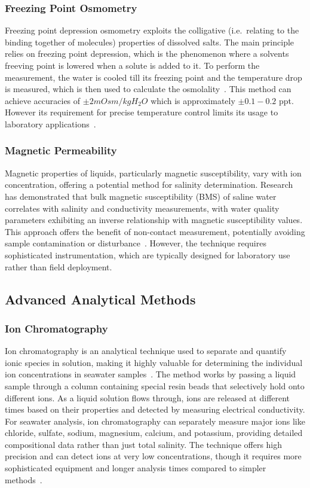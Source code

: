 \subsubsection{Freezing Point Osmometry}
Freezing point depression osmometry exploits the colligative (i.e.~relating to the binding together of molecules) properties of dissolved salts.
The main principle relies on freezing point depression, which is the phenomenon where a solvents freeving point is lowered when a solute is added to it.
To perform the measurement, the water is cooled till its freezing point and the temperature drop is measured, which is then used to calculate the osmolality~\cite{freeze_abele}.
This method can achieve accuracies of $\pm2 mOsm/kg H_{2}O$ which is approximately $\pm0.1-0.2$ \gls{ppt}. However its requirement for precise temperature control limits its usage to laboratory applications~\cite{freezing_accuracy}.


\subsubsection{Magnetic Permeability}
Magnetic properties of liquids, particularly magnetic susceptibility, vary with ion concentration, offering a potential method for salinity determination.
Research has demonstrated that bulk magnetic susceptibility (BMS) of saline water correlates with salinity and conductivity measurements, with water quality parameters exhibiting an inverse relationship with magnetic susceptibility values.
This approach offers the benefit of non-contact measurement, potentially avoiding sample contamination or disturbance~\cite{rana_magnetic_2021}.
However, the technique requires sophisticated instrumentation, which are typically designed for laboratory use rather than field deployment. 



\subsection{Advanced Analytical Methods}
\subsubsection{Ion Chromatography}
Ion chromatography is an analytical technique used to separate and quantify ionic species in solution, making it highly valuable for determining the individual ion concentrations in seawater samples~\cite{ion_chromatography}.
The method works by passing a liquid sample through a column containing special resin beads that selectively hold onto different ions.
As a liquid solution flows through, ions are released at different times based on their properties and detected by measuring electrical conductivity.
For seawater analysis, ion chromatography can separately measure major ions like chloride, sulfate, sodium, magnesium, calcium, and potassium, providing detailed compositional data rather than just total salinity. 
The technique offers high precision and can detect ions at very low concentrations, though it requires more sophisticated equipment and longer analysis times compared to simpler methods~\cite{gros_ionic_2008}.


